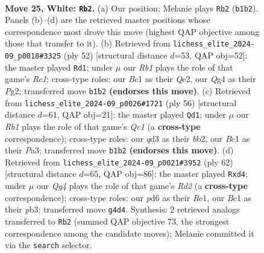 \documentclass[11pt]{article}
\begin{document}
\clearpage

\begin{figure}[p]\centering
\begin{subfigure}{0.46\textwidth}\centering
\resizebox{\linewidth}{!}{%
\newchessgame
\chessboard[
  setfen={r7/2p2kpp/3p4/8/pP1b2Q1/2Pq4/P4PPP/1RB3K1 w - - 3 25},
  showmover=false,
  pgfstyle=straightmove, color=movearrow, markmove={b1-b2}
]}
\caption{}
\end{subfigure}\hfill
\begin{subfigure}{0.46\textwidth}\centering
\resizebox{\linewidth}{!}{%
\newchessgame
\chessboard[
  setfen={8/4kp1p/6p1/ppp5/3bPq2/1P5P/P3QPP1/2R3K1 w - - 4 27},
  showmover=false,
  pgfstyle=straightmove, color=movearrow, markmove={c1-d1}
]}
\caption{}
\end{subfigure}
\\[4pt]
\begin{subfigure}{0.46\textwidth}\centering
\resizebox{\linewidth}{!}{%
\newchessgame
\chessboard[
  setfen={6k1/2r1pp1p/2N3p1/2pP4/4q3/P2R3P/1b3PP1/2Q3K1 w - - 0 29},
  showmover=false,
  pgfstyle=straightmove, color=movearrow, markmove={c1-d1}
]}
\caption{}
\end{subfigure}\hfill
\begin{subfigure}{0.46\textwidth}\centering
\resizebox{\linewidth}{!}{%
\newchessgame
\chessboard[
  setfen={4rq2/7k/6pp/2p1P3/2Pb2Q1/1p5P/3R1PP1/4R1K1 w - - 0 32},
  showmover=false,
  pgfstyle=straightmove, color=movearrow, markmove={d2-d4}
]}
\caption{}
\end{subfigure}
\caption{\textbf{Move 25, White: \texttt{Rb2}.} (a) Our position; Melanie plays \texttt{Rb2} (\texttt{b1b2}). Panels (b)--(d) are the retrieved master positions whose correspondence most drove this move (highest QAP objective among those that transfer to it). (b) Retrieved from \texttt{lichess\_elite\_2024-09\_p0018\#3325} (ply 52) [structural distance $d$=53, QAP obj=52]: the master played \texttt{Rd1}; under $\mu$ our \emph{Rb1} plays the role of that game's \emph{Rc1}; cross-type roles: our \emph{B}c1 as their \emph{Q}e2, our \emph{Q}g4 as their \emph{P}g2; transferred move \texttt{b1b2} \textbf{(endorses this move)}. (c) Retrieved from \texttt{lichess\_elite\_2024-09\_p0026\#1721} (ply 56) [structural distance $d$=61, QAP obj=21]: the master played \texttt{Qd1}; under $\mu$ our \emph{Rb1} plays the role of that game's \emph{Qc1} (a \textbf{cross-type} correspondence); cross-type roles: our \emph{q}d3 as their \emph{b}b2, our \emph{B}c1 as their \emph{P}a3; transferred move \texttt{b1b2} \textbf{(endorses this move)}. (d) Retrieved from \texttt{lichess\_elite\_2024-09\_p0021\#3952} (ply 62) [structural distance $d$=65, QAP obj=86]: the master played \texttt{Rxd4}; under $\mu$ our \emph{Qg4} plays the role of that game's \emph{Rd2} (a \textbf{cross-type} correspondence); cross-type roles: our \emph{p}d6 as their \emph{R}e1, our \emph{B}c1 as their \emph{p}b3; transferred move \texttt{g4d4}. Synthesis: 2 retrieved analogs transferred to \texttt{Rb2} (summed QAP objective 73, the strongest correspondence among the candidate moves); Melanie committed it via the \texttt{search} selector.}
\label{fig:thought-m48}
\end{figure}
\end{document}
